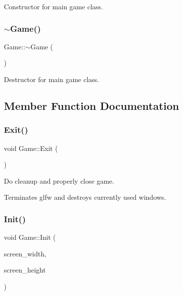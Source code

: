 Constructor for main game class. 

\mbox{\label{class_game_ae3d112ca6e0e55150d2fdbc704474530}} 
\subsubsection{\texorpdfstring{$\sim$Game()}{~Game()}}
{\footnotesize\ttfamily Game\+::$\sim$\+Game (\begin{DoxyParamCaption}{ }\end{DoxyParamCaption})}



Destructor for main game class. 



\subsection{Member Function Documentation}
\mbox{\label{class_game_ad06e374518f2c8fa38279be6712a6ea4}} 
\subsubsection{\texorpdfstring{Exit()}{Exit()}}
{\footnotesize\ttfamily void Game\+::\+Exit (\begin{DoxyParamCaption}{ }\end{DoxyParamCaption})}



Do cleanup and properly close game. 

Terminates glfw and destroys currently used windows. \mbox{\label{class_game_a8f6f29e6c7f2e33801a942ebd227cf37}} 
\subsubsection{\texorpdfstring{Init()}{Init()}}
{\footnotesize\ttfamily void Game\+::\+Init (\begin{DoxyParamCaption}\item[{G\+Luint}]{screen\+\_\+width,  }\item[{G\+Luint}]{screen\+\_\+height }\end{DoxyParamCaption})}



